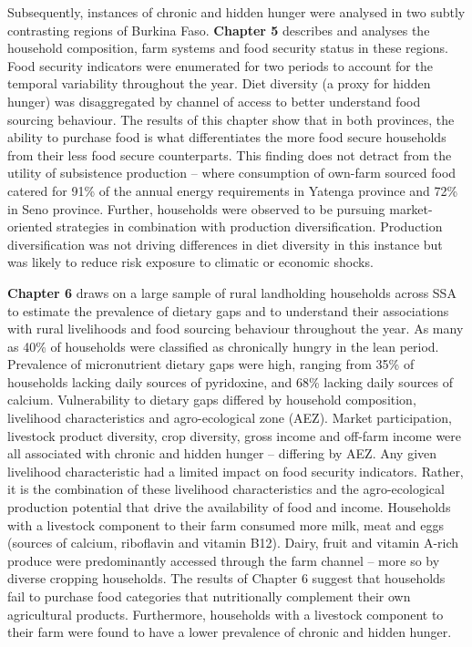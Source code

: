 Subsequently, instances of chronic and hidden hunger were analysed in two subtly contrasting regions of Burkina Faso. \textbf{Chapter 5} describes and analyses the household composition, farm systems and food security status in these regions. Food security indicators were enumerated for two periods to account for the temporal variability throughout the year. Diet diversity (a proxy for hidden hunger) was disaggregated by channel of access to better understand food sourcing behaviour. The results of this chapter show that in both provinces, the ability to purchase food is what differentiates the more food secure households from their less food secure counterparts. This finding does not detract from the utility of subsistence production -- where consumption of own-farm sourced food catered for 91\% of the annual energy requirements in Yatenga province and 72\% in Seno province. Further, households were observed to be pursuing market-oriented strategies in combination with production diversification. Production diversification was not driving differences in diet diversity in this instance but was likely to reduce risk exposure to climatic or economic shocks.

\textbf{Chapter 6} draws on a large sample of rural landholding households across SSA to estimate the prevalence of dietary gaps and to understand their associations with rural livelihoods and food sourcing behaviour throughout the year. As many as 40\% of households were classified as chronically hungry in the lean period. Prevalence of micronutrient dietary gaps were high, ranging from 35\% of households lacking daily sources of pyridoxine, and 68\% lacking daily sources of calcium. Vulnerability to dietary gaps differed by household composition, livelihood characteristics and agro-ecological zone (AEZ). Market participation, livestock product diversity, crop diversity, gross income and off-farm income were all associated with chronic and hidden hunger -- differing by AEZ. Any given livelihood characteristic had a limited impact on food security indicators. Rather, it is the combination of these livelihood characteristics and the agro-ecological production potential that drive the availability of food and income. Households with a livestock component to their farm consumed more milk, meat and eggs (sources of calcium, riboflavin and vitamin B12). Dairy, fruit and vitamin A-rich produce were predominantly accessed through the farm channel -- more so by diverse cropping households. The results of Chapter 6 suggest that households fail to purchase food categories that nutritionally complement their own agricultural products. Furthermore, households with a livestock component to their farm were found to have a lower prevalence of chronic and hidden hunger.

